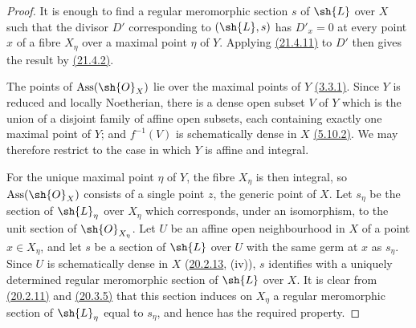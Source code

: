 \begin{proof}
It is enough to find a regular meromorphic section $s$ of $\sh{L}$ over
$X$ such that the divisor $D'$ corresponding to $(\sh{L},s)$ has
$D'_x=0$ at every point $x$ of a fibre $X_\eta$ over a maximal point
$\eta$ of $Y$.  Applying {\hyperlink{ega4.c04.cor.21-4-11}{(21.4.11)}} to $D'$ then gives the result by
{\hyperlink{ega4.c04.def.21-4-2}{(21.4.2)}}.

The points of $\operatorname{Ass}(\sh{O}_X)$ lie over the maximal
points of $Y$ {\hyperlink{ega4.c04.prop.3-3-1}{(3.3.1)}}.  Since $Y$ is reduced and locally Noetherian,
there is a dense open subset $V$ of $Y$ which is the union of a
disjoint family of affine open subsets, each containing exactly one
maximal point of $Y$; and $f^{-1}(V)$ is schematically dense in $X$
{\hyperlink{ega4.c04.prop.5-10-2}{(5.10.2)}}.  We may therefore restrict to the case in which $Y$ is
affine and integral.

For the unique maximal point $\eta$ of $Y$, the fibre $X_\eta$ is then
integral, so $\operatorname{Ass}(\sh{O}_X)$ consists of a single point
$z$, the generic point of $X$.  Let $s_\eta$ be the section of
$\sh{L}_\eta$ over $X_\eta$ which corresponds, under an isomorphism,
to the unit section of $\sh{O}_{X_\eta}$.  Let $U$ be an affine open
neighbourhood in $X$ of a point $x\in X_\eta$, and let $s$ be a section
of $\sh{L}$ over $U$ with the same germ at $x$ as $s_\eta$.  Since $U$
is schematically dense in $X$ ({\hyperlink{ega4.c04.statement.20-2-13}{20.2.13}}, (iv)), $s$ identifies with a
uniquely determined regular meromorphic section of $\sh{L}$ over $X$.
It is clear from {\hyperlink{ega4.c04.prop.20-2-11}{(20.2.11)}} and {\hyperlink{ega4.c04.prop.20-3-5}{(20.3.5)}} that this section induces on
$X_\eta$ a regular meromorphic section of $\sh{L}_\eta$ equal to
$s_\eta$, and hence has the required property.
\end{proof}
